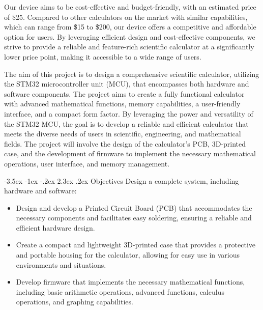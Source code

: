\documentclass[a4paper, twoside]{report}
\makeatletter
\renewcommand\section{\@startsection {section}{1}{-1em}%
  {-3.5ex \@plus -1ex \@minus -.2ex}%
  {2.3ex \@plus.2ex}%
  {\normalfont\Large\bfseries}}
\makeatother
\begin{document}
Our device aims to be cost-effective and budget-friendly, with an estimated price of \$25. Compared to other calculators on the market with similar capabilities, which can range from \$15 to \$200, our device offers a competitive and affordable option for users. By leveraging efficient design and cost-effective components, we strive to provide a reliable and feature-rich scientific calculator at a significantly lower price point, making it accessible to a wide range of users.

The aim of this project is to design a comprehensive scientific calculator, utilizing the STM32 microcontroller unit (MCU), that encompasses both hardware and software components. The project aims to create a fully functional calculator with advanced mathematical functions, memory capabilities, a user-friendly interface, and a compact form factor. By leveraging the power and versatility of the STM32 MCU, the goal is to develop a reliable and efficient calculator that meets the diverse needs of users in scientific, engineering, and mathematical fields. The project will involve the design of the calculator's PCB, 3D-printed case, and the development of firmware to implement the necessary mathematical operations, user interface, and memory management.

\section{Objectives}
Design a complete system, including hardware and software:
\begin{itemize}
    \item Design and develop a Printed Circuit Board (PCB) that accommodates the necessary components and facilitates easy soldering, ensuring a reliable and efficient hardware design.
    \item Create a compact and lightweight 3D-printed case that provides a protective and portable housing for the calculator, allowing for easy use in various environments and situations.
    \item Develop firmware that implements the necessary mathematical functions, including basic arithmetic operations, advanced functions, calculus operations, and graphing capabilities.
\end{itemize}
\end{document}
